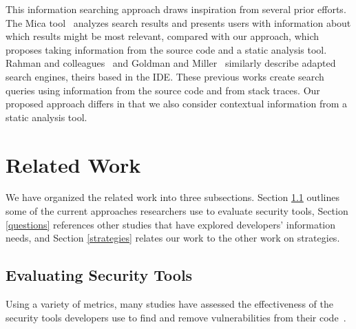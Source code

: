 \documentclass[10pt,journal,compsoc]{IEEEtran}
\begin{document}
This information searching approach draws inspiration from several prior efforts.
The Mica tool~\cite{stylos2006mica} analyzes search results and presents users with information about which results might be most relevant, compared with our approach, which proposes taking information from the source code and a static analysis tool.
Rahman and colleagues~\cite{rahman2014towards} and Goldman and Miller~\cite{goldman2009codetrail} similarly describe adapted search engines, theirs based in the IDE.
These previous works create search queries using information from the source code and from stack traces.
Our proposed approach differs in that we also consider contextual information from a static analysis tool.







\section{Related Work}
\label{sec:rw}

We have organized the related work into three subsections. 
Section \ref{evaluation} outlines some of the current approaches researchers use to evaluate security tools, Section \ref{questions} references other studies that have explored developers' information needs, and Section \ref{strategies} relates our work to the other work on strategies.

\subsection{Evaluating Security Tools}
\label{evaluation}
Using a variety of metrics, many studies have assessed the effectiveness of the security tools developers use to find and remove vulnerabilities from their code~\cite{martin2005finding, austin2011one, livshits2005finding}.  
\end{document}
